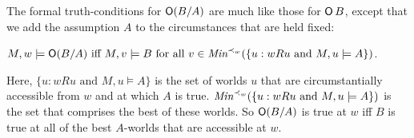 



The formal truth-conditions for $\operatorname{\mathsf{O}}(B/A)$ are much like those for $\operatorname{\mathsf{O}} B$, except
that we add the assumption $A$ to the circumstances that are held fixed:

\bigskip

\quad$M,w \models \operatorname{\mathsf{O}} (B/A) \text{ iff $M,v \models B$ for all
  $v \in \emph{Min}^{\prec_w}(\{ u: wRu \text{ and } M,u\models A \})$}$.

\bigskip\noindent%
%
Here, $\{ u: wRu \text{ and } M,u\models A \}$ is the set of worlds $u$ that are
circumstantially accessible from $w$ and at which $A$ is true.
$\emph{Min}^{\prec_{w}}(\{ u: wRu \text{ and } M,u\models A \})$ is the set that
comprises the best of these worlds. So $\operatorname{\mathsf{O}}(B/A)$ is true at $w$ iff $B$ is true
at all of the best $A$-worlds that are accessible at $w$.




